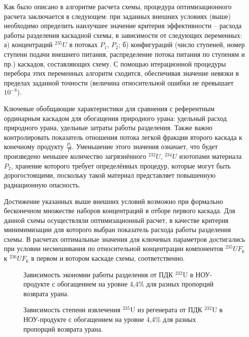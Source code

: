 Как было описано в алгоритме расчета схемы, процедура оптимизационного расчета заключается в следующем: при заданных внешних условиях (выше) необходимо определить наилучшее значение критерия эффективности -- расхода работы разделения каскадной схемы, в зависимости от следующих переменных: а) концентраций $^{235}U$ в потоках $P_1$, $P_2$; б) конфигураций (число ступеней, номер ступени подачи внешнего питания, распределение потока питания по ступеням и пр.) каскадов, составляющих схему. С помощью итерационной процедуры перебора этих переменных алгоритм сходится, обеспечивая значение невязки в пределах заданной точности (величина относительной ошибки не превышает $10^{-8}$).
 
Ключевые обобщающие характеристики для сравнения с референтным ординарным каскадом для обогащения природного урана: удельный расход природного урана, удельные затраты работы разделения. Также важно контролировать показатель отношения потока легкой фракции второго каскада к конечному продукту $\frac{P_2}{P}$. Уменьшение этого значения означает, что будет произведено меньшее количество загрязнённого $^{232}U$, $^{234}U$ изотопами материала $P_2$, хранение которого требует определённых процедур, которые могут быть дорогостоящими, поскольку такой материал представляет повышенную радиационную опасность.

Достижение указанных выше внешних условий возможно при формально бесконечном множестве наборов концентраций в отборе первого каскада. Для данной схемы осуществляли оптимизационный расчет, в качестве критерия минимимизации для которого выбран показатель расхода работы разделения схемы. В расчетах оптимальные значения для ключевых параметров достигались при условии несмешивания по относительной концентрации компонентов $^{235}UF_6$ к $^{236}UF_6$ в первом и вотором каскаде схемы, соответственно.

\begin{figure}
    \centering
    \begin{minipage}{.5\textwidth}
      \centering
      
      \caption{{Зависимость экономии работы разделения от ПДК $^{232}$U в НОУ-продукте с обогащением на уровне 4,4\% для разных пропорций возврата урана.{\label{sw44}}}}
    \end{minipage}%
    \begin{minipage}{.5\textwidth}
      \centering
      
      \caption{{Зависимость степени извлечения $^{235}$U из регенерата от ПДК $^{232}$U в НОУ-продукте с обогащением на уровне 4,4\% для разных пропорций возврата урана.{\label{exR44}}}}
    \end{minipage}
\end{figure}


